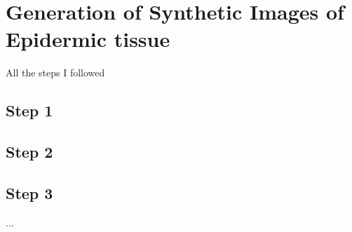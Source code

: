 \chapter{Generation of Synthetic Images of Epidermic tissue}
All the steps I followed

\section{Step 1}

\section{Step 2}

\section{Step 3}

...
